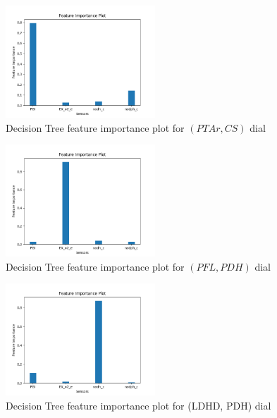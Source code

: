 \documentclass[12pt,chapterheads]{ucsd}
\begin{document}
\begin{figure}[h] 
\centering
\includegraphics[width=0.5\textwidth]{Figures/PTAr_CS_dtr_important_features}
\caption[Decision Tree feature importance plot for $(PTAr, CS)$ dial]
{Decision Tree feature importance plot for $(PTAr, CS)$ dial}
\label{fig:PtarCsDtrImp}
\end{figure}

\begin{figure}[h] 
\centering
\includegraphics[width=0.5\textwidth]{Figures/PFL_PDH_dtr_important_features}
\caption[Decision Tree feature importance plot for $(PFL, PDH)$ dial]
{Decision Tree feature importance plot for $(PFL, PDH)$ dial}
\label{fig:PflPdhDtrImp}
\end{figure}

\begin{figure}[h] 
\centering
\includegraphics[width=0.5\textwidth]{Figures/LDH_D_PDH_dtr_important_features}
\caption[Decision Tree feature importance plot for \string(LDH\textunderscore D, PDH) dial]
{Decision Tree feature importance plot for \string(LDH\textunderscore D, PDH) dial}
\label{fig:LdhPdhDtrImp}
\end{figure}
\end{document}
